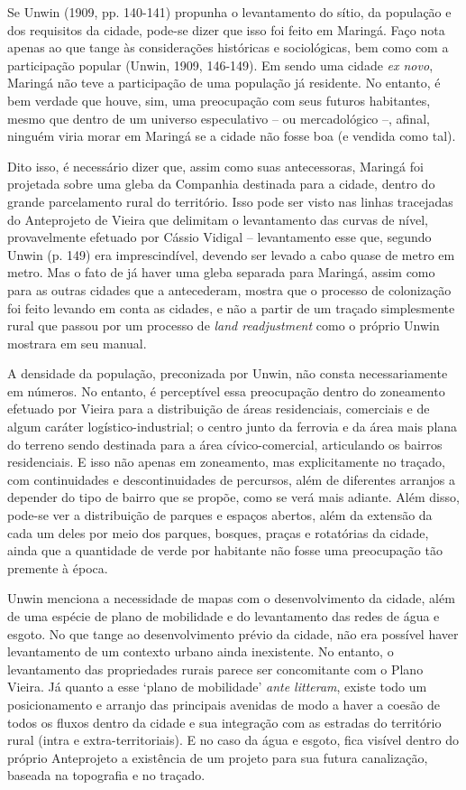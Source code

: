 \documentclass[12pt, a4paper]{book} %
\begin{document}
        Se Unwin (1909, pp. 140-141) propunha o levantamento do sítio, da população e dos requisitos da cidade, pode-se dizer que isso foi feito em Maringá. Faço nota apenas ao que tange às considerações históricas e sociológicas, bem como com a participação popular (Unwin, 1909, 146-149). Em sendo uma cidade \textit{ex novo}, Maringá não teve a participação de uma população já residente. No entanto, é bem verdade que houve, sim, uma preocupação com seus futuros habitantes, mesmo que dentro de um universo especulativo – ou mercadológico –, afinal, ninguém viria morar em Maringá se a cidade não fosse boa (e vendida como tal).

        Dito isso, é necessário dizer que, assim como suas antecessoras, Maringá foi projetada sobre uma gleba da Companhia destinada para a cidade, dentro do grande parcelamento rural do território. Isso pode ser visto nas linhas tracejadas do Anteprojeto de Vieira que delimitam o levantamento das curvas de nível, provavelmente efetuado por Cássio Vidigal – levantamento esse que, segundo Unwin (p. 149) era imprescindível, devendo ser levado a cabo quase de metro em metro. Mas o fato de já haver uma gleba separada para Maringá, assim como para as outras cidades que a antecederam, mostra que o processo de colonização foi feito levando em conta as cidades, e não a partir de um traçado simplesmente rural que passou por um processo de \textit{land readjustment} como o próprio Unwin mostrara em seu manual.

        A densidade da população, preconizada por Unwin, não consta necessariamente em números. No entanto, é perceptível essa preocupação dentro do zoneamento efetuado por Vieira para a distribuição de áreas residenciais, comerciais e de algum caráter logístico-industrial; o centro junto da ferrovia e da área mais plana do terreno sendo destinada para a área cívico-comercial, articulando os bairros residenciais. E isso não apenas em zoneamento, mas explicitamente no traçado, com continuidades e descontinuidades de percursos, além de diferentes arranjos a depender do tipo de bairro que se propõe, como se verá mais adiante. Além disso, pode-se ver a distribuição de parques e espaços abertos, além da extensão da cada um deles por meio dos parques, bosques, praças e rotatórias da cidade, ainda que a quantidade de verde por habitante não fosse uma preocupação tão premente à época.

        Unwin menciona a necessidade de mapas com o desenvolvimento da cidade, além de uma espécie de plano de mobilidade e do levantamento das redes de água e esgoto. No que tange ao desenvolvimento prévio da cidade, não era possível haver levantamento de um contexto urbano ainda inexistente. No entanto, o levantamento das propriedades rurais parece ser concomitante com o Plano Vieira. Já quanto a esse `plano de mobilidade' \textit{ante litteram}, existe todo um posicionamento e arranjo das principais avenidas de modo a haver a coesão de todos os fluxos dentro da cidade e sua integração com as estradas do território rural (intra e extra-territoriais). E no caso da água e esgoto, fica visível dentro do próprio Anteprojeto a existência de um projeto para sua futura canalização, baseada na topografia e no traçado.
\end{document}

